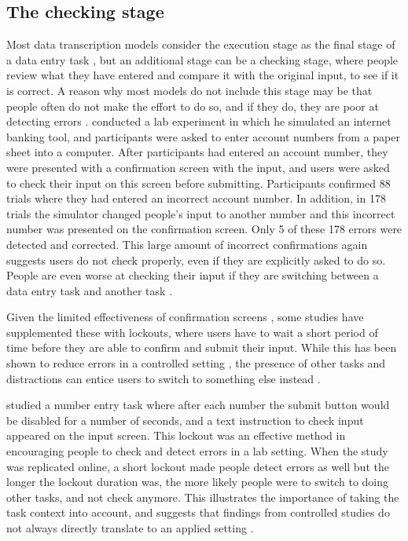 \subsection{The checking stage}
Most data transcription models consider the execution stage as the final stage of a data entry task \citep{Card1983, Salthouse1986}, but an additional stage can be a checking stage, where people review what they have entered and compare it with the original input, to see if it is correct. A reason why most models do not include this stage may be that people often do not make the effort to do so, and if they do, they are poor at detecting errors \citep{Olsen2008}. \citet{Olsen2008} conducted a lab experiment in which he simulated an internet banking tool, and participants were asked to enter account numbers from a paper sheet into a computer. After participants had entered an account number, they were presented with a confirmation screen with the input, and users were asked to check their input on this screen before submitting.  Participants confirmed 88 trials where they had entered an incorrect account number. In addition, in 178 trials the simulator changed people's input to another number and this incorrect number was presented on the confirmation screen. Only 5 of these 178 errors were detected and corrected. This large amount of incorrect confirmations again suggests users do not check properly, even if they are explicitly asked to do so. People are even worse at checking their input if they are switching between a data entry task and another task \citep{Wiseman2015}.

Given the limited effectiveness of confirmation screens \citep{Norman2002, Olsen2008}, some studies have supplemented these with lockouts, where users have to wait a short period of time before they are able to confirm and submit their input. While this has been shown to reduce errors in a controlled setting \citep{Gould2016b}, the presence of other tasks and distractions can entice users to switch to something else instead \citep{Gould2016b, Katidioti2013}.

\citet{Gould2016b} studied a number entry task where after each number the submit button would be disabled for a number of seconds, and a text instruction to check input appeared on the input screen.  This lockout was an effective method in encouraging people to check and detect errors in a lab setting. When the study was replicated online, a short lockout made people detect errors as well but the longer the lockout duration was, the more likely people were to switch to doing other tasks, and not check anymore. This illustrates the importance of taking the task context into account, and suggests that findings from controlled studies do not always directly translate to an applied setting \citep{Gould2016b}. 

